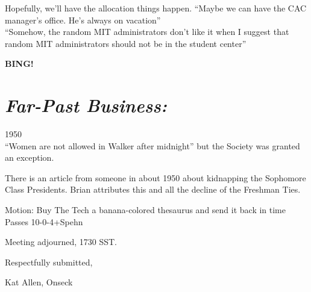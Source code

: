 \documentclass[10pt]{article}
\newcommand{\bing}{{\bf BING!} }
\newcommand{\goto}[1]{\bing \vskip 12pt \section*{{\em{#1}}}}
\begin{document}
Hopefully, we'll have the allocation things happen.
``Maybe we can have the CAC manager's office. He's always on vacation''\\
``Somehow, the random MIT administrators don't like it when I suggest
that random MIT administrators should not be in the student center''

\goto{Far-Past Business:}
1950\\
``Women are not allowed in Walker after midnight'' but the Society was
granted an exception.

There is an article from someone in about 1950 about kidnapping the
Sophomore Class Presidents.  Brian attributes this and all the decline
of the Freshman Ties.

Motion: Buy The Tech a banana-colored thesaurus and send it back in
time\\
Passes 10-0-4+Spehn

\vspace{12pt}

\noindent
Meeting adjourned, 1730 SST.

\vspace{18pt}

\centerline{Respectfully submitted,}
\centerline{Kat Allen,  Onseck}
\end{document}
